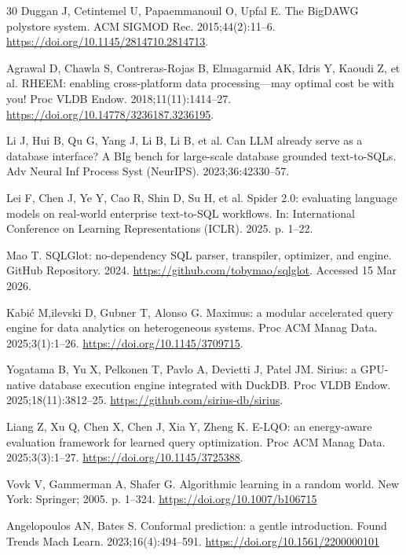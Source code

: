 \documentclass[10pt,a4paper]{article}
\begin{document}
{\begin{thebibliography}{30}
Duggan J, Cetintemel U, Papaemmanouil O, Upfal E. The BigDAWG polystore system. ACM SIGMOD Rec. 2015;44(2):11--6. \url{https://doi.org/10.1145/2814710.2814713}.

Agrawal D, Chawla S, Contreras-Rojas B, Elmagarmid AK, Idris Y, Kaoudi Z, et al. RHEEM: enabling cross-platform data processing---may optimal cost be with you! Proc VLDB Endow. 2018;11(11):1414--27. \url{https://doi.org/10.14778/3236187.3236195}.

Li J, Hui B, Qu G, Yang J, Li B, Li B, et al. Can LLM already serve as a database interface? A BIg bench for large-scale database grounded text-to-SQLs. Adv Neural Inf Process Syst (NeurIPS). 2023;36:42330--57.

Lei F, Chen J, Ye Y, Cao R, Shin D, Su H, et al. Spider 2.0: evaluating language models on real-world enterprise text-to-SQL workflows. In: International Conference on Learning Representations (ICLR). 2025. p. 1--22.

Mao T. SQLGlot: no-dependency SQL parser, transpiler, optimizer, and engine. GitHub Repository. 2024. \url{https://github.com/tobymao/sqlglot}. Accessed 15 Mar 2026.

Kabi\'{c} M,ilevski D, Gubner T, Alonso G. Maximus: a modular accelerated query engine for data analytics on heterogeneous systems. Proc ACM Manag Data. 2025;3(1):1--26. \url{https://doi.org/10.1145/3709715}.

Yogatama B, Yu X, Pelkonen T, Pavlo A, Devietti J, Patel JM. Sirius: a GPU-native database execution engine integrated with DuckDB. Proc VLDB Endow. 2025;18(11):3812--25. \url{https://github.com/sirius-db/sirius}.

Liang Z, Xu Q, Chen X, Chen J, Xia Y, Zheng K. E-LQO: an energy-aware evaluation framework for learned query optimization. Proc ACM Manag Data. 2025;3(3):1--27. \url{https://doi.org/10.1145/3725388}.

Vovk V, Gammerman A, Shafer G. Algorithmic learning in a random world. New York: Springer; 2005. p. 1--324. \url{https://doi.org/10.1007/b106715}

Angelopoulos AN, Bates S. Conformal prediction: a gentle introduction. Found Trends Mach Learn. 2023;16(4):494--591. \url{https://doi.org/10.1561/2200000101}


\end{thebibliography}}
\end{document}
